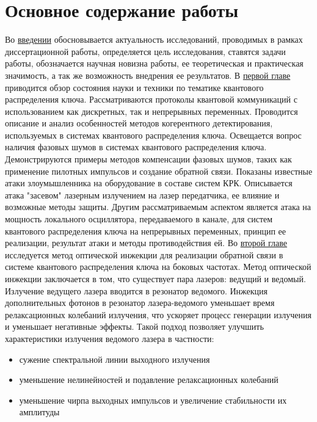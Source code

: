 

\section*{Основное содержание работы }
Во \underline{введении} обосновывается актуальность исследований, проводимых в рамках диссертационной работы, определяется цель исследования, ставятся задачи работы, обозначается научная новизна работы, ее теоретическая и практическая значимость, а так же возможность внедрения ее результатов. 
\newline В \underline{первой главе} приводится обзор состояния науки и техники по тематике квантового распределения ключа. Рассматриваются протоколы квантовой коммуникаций с использованием как дискретных, так и непрерывных переменных. Проводится описание и анализ особенностей методов когерентного детектирования, используемых в системах квантового распределения ключа. Освещается вопрос наличия фазовых шумов в системах квантового распределения ключа. Демонстрируются примеры методов компенсации фазовых шумов, таких как применение пилотных импульсов и создание обратной связи.  Показаны известные атаки злоумышленника на оборудование в составе систем КРК. Описывается атака "засевом" лазерным излучением на лазер передатчика, ее влияние и возможные методы защиты. Другим рассматриваемым аспектом является атака на мощность локального осциллятора, передаваемого в канале, для систем квантового распределения ключа на непрерывных переменных, принцип ее реализации, результат атаки и методы противодействия ей.
\newline Во \underline{второй главе} исследуется метод оптической инжекции  для реализации обратной связи в системе квантового распределения ключа на боковых частотах. Метод оптической инжекции заключается в том, что существует пара лазеров: ведущий и ведомый. Излучение ведущего лазера вводится в резонатор ведомого. Инжекция дополнительных фотонов в резонатор лазера-ведомого уменьшает время релаксационных колебаний излучения, что ускоряет процесс генерации излучения и уменьшает негативные эффекты. Такой подход позволяет улучшить характеристики излучения ведомого лазера в частности:
\begin{itemize}
    \item сужение спектральной линии выходного излучения
    \item уменьшение нелинейностей и подавление релаксационных колебаний
    \item уменьшение чирпа выходных импульсов и увеличение стабильности их амплитуды
\end{itemize}
